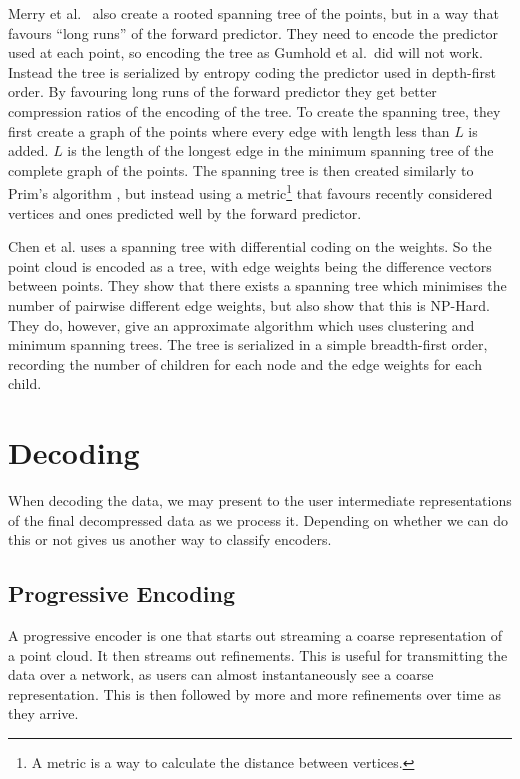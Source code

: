 \documentclass[11pt,twocolumn]{article}
\begin{document}
Merry et al.~\cite{merrycomp} also create a rooted spanning tree of the
points, but in a way that favours ``long runs'' of the forward predictor. They
need to encode the predictor used at each point, so encoding the tree as
Gumhold et al.\ did will not work. Instead the tree is serialized by entropy
coding the predictor used in depth-first order. By favouring long runs of the
forward predictor they get better compression ratios of the encoding of the
tree. To create the spanning tree, they first create a graph of the points
where every edge with length less than $L$ is added. $L$ is the length of the
longest edge in the minimum spanning tree of the complete graph of the
points. The spanning tree is then created similarly to Prim's algorithm
\cite[p.\ 457]{sedgewick}, but instead using a metric\footnote{A metric is a
  way to calculate the distance between vertices.} that favours recently
considered vertices and ones predicted well by the forward predictor.

Chen et al.\cite{chen2005lcp} uses a spanning tree with differential coding on
the weights. So the point cloud is encoded as a tree, with edge weights being
the difference vectors between points. They show that there exists a spanning
tree which minimises the number of pairwise different edge weights, but also
show that this is NP-Hard. They do, however, give an approximate algorithm
which uses clustering and minimum spanning trees. The tree is serialized in a
simple breadth-first order, recording the number of children for each node and
the edge weights for each child.


\section{Decoding}

When decoding the data, we may present to the user intermediate
representations of the final decompressed data as we process it. Depending on
whether we can do this or not gives us another way to classify encoders.

\subsection{Progressive Encoding}

A progressive encoder is one that starts out streaming a coarse representation
of a point cloud. It then streams out refinements. This is useful for
transmitting the data over a network, as users can almost instantaneously see
a coarse representation. This is then followed by more and more refinements
over time as they arrive.
\end{document}
